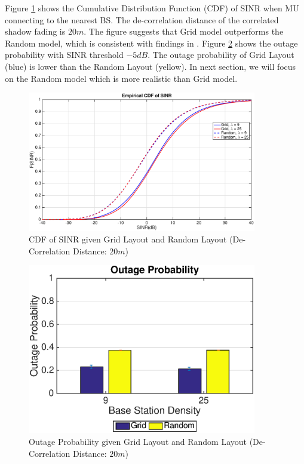  \par Figure \ref{4:cdf1} shows the Cumulative Distribution Function (CDF) of SINR when MU connecting to the nearest BS. The de-correlation distance of the correlated shadow fading is $20m$. The figure suggests that Grid model outperforms the Random model, which is consistent with findings in \cite{andrews2011tractable}. Figure \ref{4:outage1} shows the outage probability with SINR threshold $-5dB$. The outage probability of Grid Layout (blue) is lower than the Random Layout (yellow). In next section, we will focus on the Random model which is more realistic than Grid model.
 \begin{figure}
 \centering
 \includegraphics[width=10cm]{GridVSRandom.eps}
 \caption{CDF of SINR given Grid Layout and Random Layout (De-Correlation Distance: $20m$)}
 \label{4:cdf1}
 \end{figure}
 \begin{figure}
 \centering
 \includegraphics[width=10cm]{OutageProbGridVSRandom.eps}
 \caption{Outage Probability given Grid Layout and Random Layout (De-Correlation Distance: $20m$)}
 \label{4:outage1}
 \end{figure}


